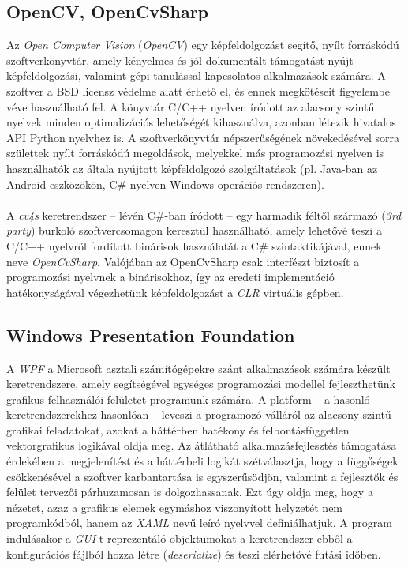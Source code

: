 \subsection{OpenCV, OpenCvSharp}

Az \emph{Open Computer Vision} (\emph{OpenCV}) egy képfeldolgozást segítő, nyílt forráskódú szoftverkönyvtár, amely kényelmes és jól dokumentált támogatást nyújt képfeldolgozási, valamint gépi tanulással kapcsolatos alkalmazások számára. A szoftver a BSD licensz védelme alatt érhető el, és ennek megkötéseit figyelembe véve használható fel. A könyvtár C/C++ nyelven íródott az alacsony szintű nyelvek minden optimalizációs lehetőségét kihasználva, azonban létezik hivatalos API Python nyelvhez is. A szoftverkönyvtár népszerűségének növekedésével sorra születtek nyílt forráskódú megoldások, melyekkel más programozási nyelven is használhatók az általa nyújtott képfeldolgozó szolgáltatások (pl. Java-ban az Android eszközökön, C\# nyelven Windows operációs rendszeren).\\
\\
A \emph{cv4s} keretrendszer -- lévén C\#-ban íródott -- egy harmadik féltől származó (\emph{3rd party}) burkoló szoftvercsomagon keresztül használható, amely lehetővé teszi a C/C++ nyelvről fordított binárisok használatát a C\# szintaktikájával, ennek neve \emph{OpenCvSharp}. Valójában az OpenCvSharp csak interfészt biztosít a programozási nyelvnek a binárisokhoz, így az eredeti implementáció hatékonyságával végezhetünk képfeldolgozást a \emph{CLR} virtuális gépben.

\subsection{Windows Presentation Foundation} \label{subs:wpf_intro}

A \emph{WPF} a Microsoft asztali számítógépekre szánt alkalmazások számára készült keretrendszere, amely segítségével egységes programozási modellel fejleszthetünk grafikus felhasználói felületet programunk számára. A platform -- a hasonló keretrendszerekhez hasonlóan -- leveszi a programozó válláról az alacsony szintű grafikai feladatokat, azokat a háttérben hatékony és felbontásfüggetlen vektorgrafikus logikával oldja meg. Az átlátható alkalmazásfejlesztés támogatása érdekében a megjelenítést és a háttérbeli logikát szétválasztja, hogy a függőségek csökkenésével a szoftver karbantartása is egyszerűsödjön, valamint a fejlesztők és felület tervezői párhuzamosan is dolgozhassanak. Ezt úgy oldja meg, hogy a nézetet, azaz a grafikus elemek egymáshoz viszonyított helyzetét nem programkódból, hanem az \emph{XAML} nevű leíró nyelvvel definiálhatjuk. A program indulásakor a \emph{GUI}-t reprezentáló objektumokat a keretrendszer ebből a konfigurációs fájlból hozza létre (\emph{deserialize}) és teszi elérhetővé futási időben. 


